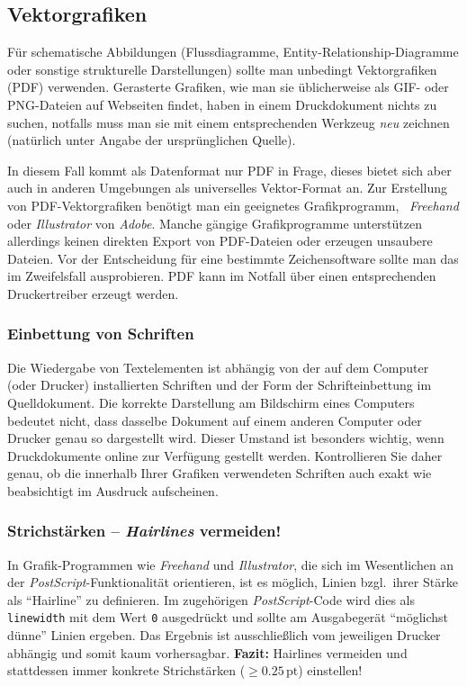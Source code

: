 \subsection{Vektorgrafiken}

Für schematische Abbildungen (\zB Flussdiagramme, Entity-Relationship-Diagramme
oder sonstige strukturelle Darstellungen) sollte man unbedingt
Vektorgrafiken (PDF) verwenden. %
Gerasterte Grafiken, wie man sie üblicherweise als GIF- oder PNG-Dateien
auf Webseiten findet, haben in einem Druckdokument nichts zu suchen, notfalls
muss man sie mit einem entsprechenden Werkzeug \emph{neu} zeichnen (natürlich
unter Angabe der ursprünglichen Quelle).

In diesem Fall kommt als Datenformat nur PDF %
in Frage,
dieses bietet sich aber auch in anderen Umgebungen als universelles
Vektor-Format an.
Zur Erstellung von PDF-Vektorgrafiken benötigt man ein geeignetes
Grafikprogramm, \zB\ \emph{Freehand} %
oder \emph{Illustrator} von \emph{Adobe}.
Manche gängige Grafikprogramme 
unterstützen allerdings keinen direkten Export von PDF-Dateien
oder erzeugen unsaubere Dateien. Vor der Entscheidung
für eine bestimmte Zeichensoftware sollte man das im Zweifelsfall
ausprobieren.
PDF kann im Notfall über einen entsprechenden Druckertreiber erzeugt werden.




\subsubsection{Einbettung von Schriften}

Die Wiedergabe von Textelementen ist abhängig von der auf dem
Computer (oder Drucker) installierten Schriften und der Form der
Schrifteinbettung im Quelldokument. Die korrekte Darstellung am
Bildschirm eines Computers bedeutet nicht, dass dasselbe Dokument
auf einem anderen Computer oder Drucker genau so dargestellt wird.
Dieser Umstand ist besonders wichtig, wenn Druckdokumente online
zur Verfügung gestellt werden. Kontrollieren Sie daher genau, ob
die innerhalb Ihrer Grafiken verwendeten Schriften auch exakt wie
beabsichtigt im Ausdruck aufscheinen.


\subsubsection{Strichstärken -- \emph{Hairlines} vermeiden!}

In Grafik-Programmen wie \emph{Freehand} und \emph{Illustrator},
die sich im Wesentlichen an der \emph{PostScript}-Funktionalität
orientieren, ist es möglich, Linien bzgl.\ ihrer Stärke als
"`Hairline"' zu definieren. Im zugehörigen \emph{PostScript}-Code
wird dies als \texttt{linewidth} mit dem Wert \texttt{0} ausgedrückt und
sollte am Ausgabegerät "`möglichst dünne"' Linien ergeben. 
Das Ergebnis ist ausschließlich vom jeweiligen Drucker
abhängig und somit kaum vorhersagbar.
\textbf{Fazit:} Hairlines vermeiden und stattdessen immer konkrete
Strichstärken ($\geq 0.25\,\mathrm{pt}$) einstellen!


